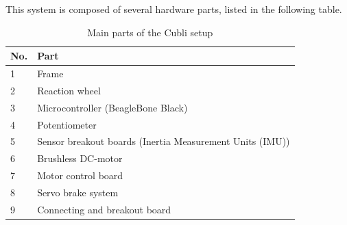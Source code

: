 This system is composed of several hardware parts, listed in the following table. 

\begin{table}[H]
	\begin{tabular}{|l|p{6.7cm}|}
		\hline %
		\textbf{No.} &\textbf{Part} 			\\
		\hline %
		1            & Frame           			\\
		\hline %
		2            & Reaction wheel      		\\
		\hline %
		3            & Microcontroller (BeagleBone Black)  \\
		\hline %
		4            & Potentiometer			\\
		\hline %
		5            & Sensor breakout boards (Inertia Measurement Units (IMU))       			\\
		\hline %
		6            & Brushless DC-motor   	\\
		\hline %
		7            & Motor control board     	\\
		\hline %
		8            & Servo brake system 		    	\\
		\hline %
		9            & Connecting and breakout board		    	\\
		\hline %
	\end{tabular}
	\caption{Main parts of the Cubli setup}
\label{TableAAUCubliComponent}
\end{table}


